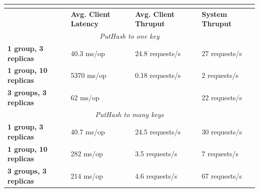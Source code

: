 \documentclass[letterpaper,10pt]{article}
\begin{document}
\begin{table}[h]
\begin{tabular}{|l|l|l|l|}
\hline
\multicolumn{4}{|c|}{\cellcolor[HTML]{C0C0C0}{\color[HTML]{000000} \textbf{Vanilla Paxos}}}                           \\ \hline
                              & \textbf{Avg. Client Latency} & \textbf{Avg. Client Thruput} & \textbf{System Thruput} \\ \hline
\multicolumn{4}{|c|}{\textit{PutHash to one key}}                                                                     \\ \hline
\textbf{1 group, 3 replicas}  & 40.3 ms/op                   & 24.8 requests/s              & 27 requests/s           \\ \hline
\textbf{1 group, 10 replicas} & 5370 ms/op                   & 0.18 requests/s              & 2 requests/s            \\ \hline
\textbf{3 groups, 3 replicas} & 62 ms/op                     &                              & 22 requests/s           \\ \hline
\multicolumn{4}{|c|}{\textit{PutHash to many keys}}                                                                   \\ \hline
\textbf{1 group, 3 replicas}  & 40.7 ms/op                   & 24.5 requests/s              & 30 requests/s           \\ \hline
\textbf{1 group, 10 replicas} & 282 ms/op                    & 3.5 requests/s               & 7 requests/s            \\ \hline
\textbf{3 groups, 3 replicas} & 214 ms/op                    & 4.6 requests/s               & 67 requests/s           \\ \hline
\end{tabular}
\end{table}
\end{document}
